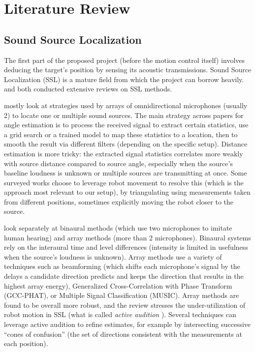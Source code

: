 \section{Literature Review}
\subsection{Sound Source Localization}

The first part of the proposed project (before the motion control itself) involves deducing the target's position by sensing its acoustic transmissions. Sound Source Localization (SSL) is a mature field from which the project can borrow heavily. \citet{rascon2017review} and
\citet{argentieri2015survey} both conducted extensive reviews on SSL methods.

\citet{rascon2017review} mostly look at strategies used by arrays of omnidirectional microphones (usually 2) to locate one or multiple sound sources. The main strategy across papers for angle estimation is to process the received signal to extract certain statistics, use a grid search or a trained model to map these statistics to a location, then to smooth the result via different filters (depending on the specific setup). Distance estimation is more tricky: the extracted signal statistics correlates more weakly with source distance compared to source angle, especially when the source's baseline loudness is unknown or multiple sources are transmitting at once. Some surveyed works choose to leverage robot movement to resolve this (which is the approach most relevant to our setup), by triangulating using measurements taken from different positions, sometimes explicitly moving the robot closer to the source. 

\citet{argentieri2015survey} look separately at binaural methods (which use two
microphones to imitate human hearing) and array methods (more than 2 microphones). Binaural
systems rely on the interaural time and level differences (intensity is limited in usefulness when the source's loudness is unknown). Array methods use a variety of techniques such as beamforming (which shifts each microphone’s signal by the delays a candidate direction predicts and keeps the direction that results in the highest array energy), Generalized Cross-Correlation with Phase Transform (GCC-PHAT), or Multiple Signal Classification (MUSIC).
Array methods are found to be overall more robust, and the review stresses the under-utilization of robot motion in SSL (what is called \emph{active audition} \cite{nakadai2000active}). Several techniques can leverage active audition to refine estimates, for example by intersecting successive ``cones of confusion'' (the set of directions consistent with the measurements at each position).

